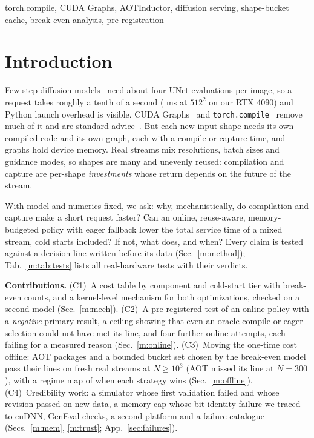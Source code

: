 \documentclass[conference]{IEEEtran}
\begin{document}
\begin{IEEEkeywords}
torch.compile, CUDA Graphs, AOTInductor, diffusion serving, shape-bucket cache, break-even analysis, pre-registration
\end{IEEEkeywords}

\section{Introduction}\label{m:intro}
Few-step diffusion models~\cite{lcm,lcmlora} need about four UNet evaluations per image, so a request takes roughly a tenth of a second (\NSTwoCostEZeroSteadyMs{} ms at $512^2$ on our RTX 4090) and Python launch overhead is visible. CUDA Graphs~\cite{gray2019} and \texttt{torch.compile}~\cite{ansel2024} remove much of it and are standard advice~\cite{hf_fp16,pt_blog}. But each new input shape needs its own compiled code and its own graph, each with a compile or capture time, and graphs hold device memory. Real streams mix resolutions, batch sizes and guidance modes, so shapes are many and unevenly reused: compilation and capture are per-shape \emph{investments} whose return depends on the future of the stream.

With model and numerics fixed, we ask: why, mechanistically, do compilation and capture make a short request faster? Can an online, reuse-aware, memory-budgeted policy with eager fallback lower the total service time of a mixed stream, cold starts included? If not, what does, and when? Every claim is tested against a decision line written before its data (Sec.~\ref{m:method}); Tab.~\ref{m:tab:tests} lists all real-hardware tests with their verdicts.

\textbf{Contributions.} (C1)~A cost table by component and cold-start tier with break-even counts, and a kernel-level mechanism for both optimizations, checked on a second model (Sec.~\ref{m:mech}). (C2)~A pre-registered test of an online policy with a \emph{negative} primary result, a ceiling showing that even an oracle compile-or-eager selection could not have met its line, and four further online attempts, each failing for a measured reason (Sec.~\ref{m:online}). (C3)~Moving the one-time cost offline: AOT packages and a bounded bucket set chosen by the break-even model pass their lines on fresh real streams at $N{\ge}10^3$ (AOT missed its line at $N{=}300$), with a regime map of when each strategy wins (Sec.~\ref{m:offline}). (C4)~Credibility work: a simulator whose first validation failed and whose revision passed on new data, a memory cap whose bit-identity failure we traced to cuDNN, GenEval checks, a second platform and a failure catalogue (Secs.~\ref{m:mem}, \ref{m:trust}; App.~\ref{sec:failures}).
\end{document}

